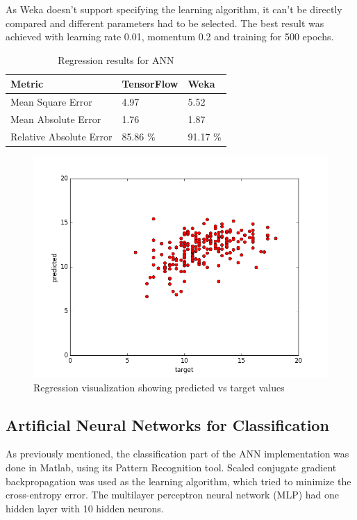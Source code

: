 As Weka doesn't support specifying the learning algorithm, it can't be directly compared and different parameters had to be selected. The best result was achieved with learning rate 0.01, momentum 0.2 and training for 500 epochs.

\begin{table}[h!]
  \centering
  \begin{tabular}{lll}
  \hline
 \textbf{Metric} & \textbf{TensorFlow} & \textbf{Weka} \\ \hline
  Mean Square Error & 4.97 & 5.52 \\
  Mean Absolute Error & 1.76 & 1.87\\
  Relative Absolute Error & 85.86 \% & 91.17 \%\\
  \hline
  \end{tabular}
  \caption{Regression results for ANN}
  \label{tab:table2}
\end{table}

\begin{figure}[h!]
    \centering
    \includegraphics[width = 0.9\linewidth]{regression_test.png}
    \caption{Regression visualization showing predicted vs target values}
    \label{fig:fig1}
\end{figure}


\subsection{Artificial Neural Networks for Classification}
As previously mentioned, the classification part of the ANN implementation was done in Matlab, using its Pattern Recognition tool. Scaled conjugate gradient backpropagation was used as the learning algorithm, which tried to minimize the cross-entropy error. The multilayer perceptron neural network (MLP) had one hidden layer with 10 hidden neurons.

